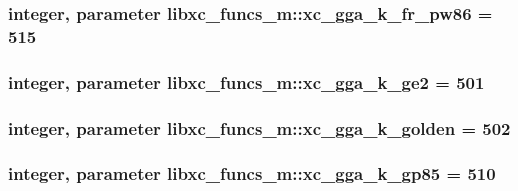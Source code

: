 \hypertarget{classlibxc__funcs__m_a512d0cc3d8821ba0800cc2b98c371bd9}{
\subsubsection[{xc\-\_\-gga\-\_\-k\-\_\-fr\-\_\-pw86}]{\setlength{\rightskip}{0pt plus 5cm}integer, parameter libxc\-\_\-funcs\-\_\-m\-::xc\-\_\-gga\-\_\-k\-\_\-fr\-\_\-pw86 = 515}}\label{classlibxc__funcs__m_a512d0cc3d8821ba0800cc2b98c371bd9}
\hypertarget{classlibxc__funcs__m_a9a6842918af16d31f1a9346faf6b9345}{
\subsubsection[{xc\-\_\-gga\-\_\-k\-\_\-ge2}]{\setlength{\rightskip}{0pt plus 5cm}integer, parameter libxc\-\_\-funcs\-\_\-m\-::xc\-\_\-gga\-\_\-k\-\_\-ge2 = 501}}\label{classlibxc__funcs__m_a9a6842918af16d31f1a9346faf6b9345}
\hypertarget{classlibxc__funcs__m_a60330d5d93aa1fd5eb63d044f2c2e309}{
\subsubsection[{xc\-\_\-gga\-\_\-k\-\_\-golden}]{\setlength{\rightskip}{0pt plus 5cm}integer, parameter libxc\-\_\-funcs\-\_\-m\-::xc\-\_\-gga\-\_\-k\-\_\-golden = 502}}\label{classlibxc__funcs__m_a60330d5d93aa1fd5eb63d044f2c2e309}
\hypertarget{classlibxc__funcs__m_a77de61311b5ac4df12321dd99af129cd}{
\subsubsection[{xc\-\_\-gga\-\_\-k\-\_\-gp85}]{\setlength{\rightskip}{0pt plus 5cm}integer, parameter libxc\-\_\-funcs\-\_\-m\-::xc\-\_\-gga\-\_\-k\-\_\-gp85 = 510}}\label{classlibxc__funcs__m_a77de61311b5ac4df12321dd99af129cd}
